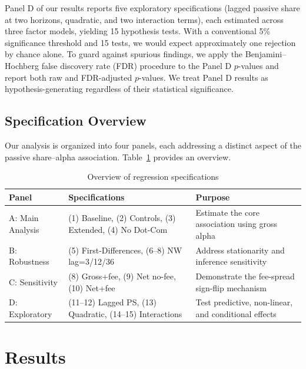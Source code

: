 \documentclass[11pt, a4paper]{article}
\begin{document}
Panel D of our results reports five exploratory specifications (lagged passive share at two horizons, quadratic, and two interaction terms), each estimated across three factor models, yielding 15 hypothesis tests. With a conventional 5\% significance threshold and 15 tests, we would expect approximately one rejection by chance alone. To guard against spurious findings, we apply the Benjamini--Hochberg false discovery rate (FDR) procedure \parencite{benjamini1995} to the Panel D $p$-values and report both raw and FDR-adjusted $p$-values. We treat Panel D results as hypothesis-generating regardless of their statistical significance.

\subsection{Specification Overview}

Our analysis is organized into four panels, each addressing a distinct aspect of the passive share--alpha association. Table~\ref{tab:spec_overview} provides an overview.

\begin{table}[H]
\centering
\caption{Overview of regression specifications}
\label{tab:spec_overview}
\small
\begin{tabularx}{\textwidth}{llX}
\toprule
\textbf{Panel} & \textbf{Specifications} & \textbf{Purpose} \\
\midrule
A: Main Analysis & (1) Baseline, (2) Controls, (3) Extended, (4) No Dot-Com & Estimate the core association using gross alpha \\
B: Robustness & (5) First-Differences, (6--8) NW lag=3/12/36 & Address stationarity and inference sensitivity \\
C: Sensitivity & (8) Gross+fee, (9) Net no-fee, (10) Net+fee & Demonstrate the fee-spread sign-flip mechanism \\
D: Exploratory & (11--12) Lagged PS, (13) Quadratic, (14--15) Interactions & Test predictive, non-linear, and conditional effects \\
\bottomrule
\end{tabularx}
\end{table}


\section{Results}
\label{sec:results}
\end{document}
